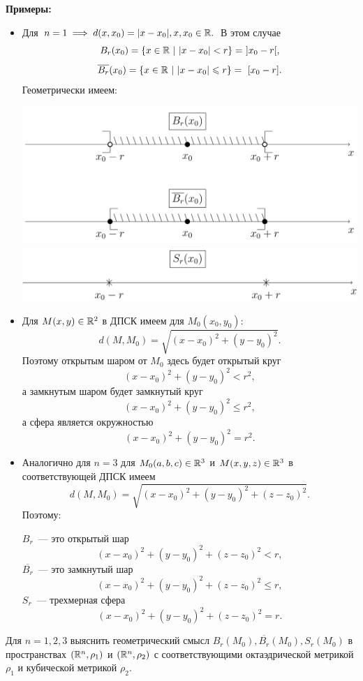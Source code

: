 \documentclass[../../main.tex]{subfiles}
\begin{document}
  \smallskip
  \textbf{Примеры:}
  \begin{itemize}
  \item Для $n = 1 \implies d(x, x_0) = |x - x_0|, x, x_0 \in \mathbb{R}.
  $ В этом случае 
  \[
    B_r(x_0) = \{x \in \mathbb{R}\ |\ |x - x_0| < r\} =\ ] x_0 - r [,
  \]
  \[
    \overline{B_r}(x_0) = \{x \in \R\ |\ |x - x_0| \leqslant r\} =\ 
    [ x_0 - r ].
  \]
  Геометрически имеем:
  
  \includegraphics[width=\linewidth]{2019-02-15_17-21-02.png}
  \includegraphics[width=\linewidth]{2019-02-15_17-21-17.png}
  
  \item  Для $M(x, y) \in \mathbb{R}^2$ в ДПСК имеем для $M_0(x_0, y_0)$:
  \[
    d(M, M_0) = \sqrt{(x - x_0)^2 + (y - y_0)^2}.
  \]
  Поэтому открытым шаром от $M_0$ здесь будет открытый круг 
  \[
    (x - x_0)^2 + (y - y_0)^2 < r^2,
  \]
  а замкнутым шаром будет замкнутый круг 
  \[
    (x - x_0)^2 + (y - y_0)^2 \leqslant r^2,
  \]
  а сфера является окружностью 
  \[
    (x - x_0)^2 + (y - y_0)^2 = r^2.
  \]
  
  \item Аналогично для $n = 3$ для $M_0(a, b, c) \in \mathbb{R}^3$ и $M(x, 
  y, z) \in \mathbb{R}^3$ в соответствующей ДПСК имеем  
  \[
    d(M, M_0) = \sqrt{(x - x_0)^2 + (y - y_0)^2 + (z - z_0)^2}.
  \]
  Поэтому:
  
  $B_r$~--- это открытый шар
  \[
    (x - x_0)^2 + (y - y_0)^2 + (z - z_0)^2 < r,
  \]
  $\overline{B_r}$~--- это замкнутый шар
  \[
  (x - x_0)^2 + (y - y_0)^2 + (z - z_0)^2 \leqslant r,
  \]  
  $S_r$~--- трехмерная сфера
  \[
  (x - x_0)^2 + (y - y_0)^2 + (z - z_0)^2 = r.
  \]
  \end{itemize}
  \begin{exc}
    Для $n = 1, 2, 3$  выяснить геометрический смысл $B_r(M_0), 
    \overline{B_r}(M_0),  S_r(M_0)$ в пространствах $(\mathbb{R}^n, \rho_1)$ 
    и $(\mathbb{R}^n, \rho_2)$  с соответствующими октаэдрической метрикой 
    $\rho_1$ и кубической метрикой $\rho_2$. 
  \end{exc}
\end{document}
